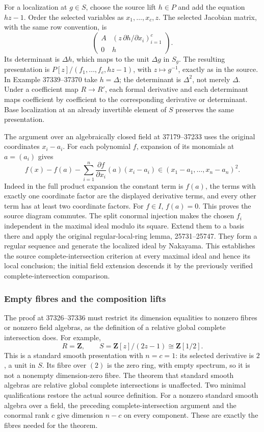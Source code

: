 For a localization at \(g\in S\), choose the source lift \(h\in P\) and add the equation \(hz-1\). Order the selected variables as \(x_1,\ldots,x_c,z\). The selected Jacobian matrix, with the same row convention, is \[
\begin{pmatrix}
A & (z\,\partial h/\partial x_i)_{i=1}^c\\
0 & h
\end{pmatrix}.
\] Its determinant is \(\Delta h\), which maps to the unit \(\Delta g\) in \(S_g\). The resulting presentation is \(P[z]/(f_1,\ldots,f_c,hz-1)\), with \(z\mapsto g^{-1}\), exactly as in the source. In Example 37339--37370 take \(h=\Delta\); the determinant is \(\Delta^2\), not merely \(\Delta\). Under a coefficient map \(R\to R'\), each formal derivative and each determinant maps coefficient by coefficient to the corresponding derivative or determinant. Base localization at an already invertible element of \(S\) preserves the same presentation.

The argument over an algebraically closed field at 37179--37233 uses the original coordinates \(x_i-a_i\). For each polynomial \(f\), expansion of its monomials at \(a=(a_i)\) gives \[
f(x)-f(a)-\sum_{i=1}^n\frac{\partial f}{\partial x_i}(a)(x_i-a_i)
\in(x_1-a_1,\ldots,x_n-a_n)^2.
\] Indeed in the full product expansion the constant term is \(f(a)\), the terms with exactly one coordinate factor are the displayed derivative terms, and every other term has at least two coordinate factors. For \(f\in I\), \(f(a)=0\). This proves the source diagram commutes. The split conormal injection makes the chosen \(f_i\) independent in the maximal ideal modulo its square. Extend them to a basis there and apply the original regular-local-ring lemma, 25731--25747. They form a regular sequence and generate the localized ideal by Nakayama. This establishes the source complete-intersection criterion at every maximal ideal and hence its local conclusion; the initial field extension descends it by the previously verified complete-intersection comparison.

\subsubsection{Empty fibres and the composition lifts}\label{algebra-proof-047-empty-fibres-and-the-composition-lifts}

The proof at 37326--37336 must restrict its dimension equalities to nonzero fibres or nonzero field algebras, as the definition of a relative global complete intersection does. For example, \[
R=\mathbf Z,\qquad S=\mathbf Z[z]/(2z-1)\cong\mathbf Z[1/2].
\] This is a standard smooth presentation with \(n=c=1\): its selected derivative is \(2\), a unit in \(S\). Its fibre over \((2)\) is the zero ring, with empty spectrum, so it is not a nonempty dimension-zero fibre. The theorem that standard smooth algebras are relative global complete intersections is unaffected. Two minimal qualifications restore the actual source definition. For a nonzero standard smooth algebra over a field, the preceding complete-intersection argument and the conormal rank \(c\) give dimension \(n-c\) on every component. These are exactly the fibres needed for the theorem.

